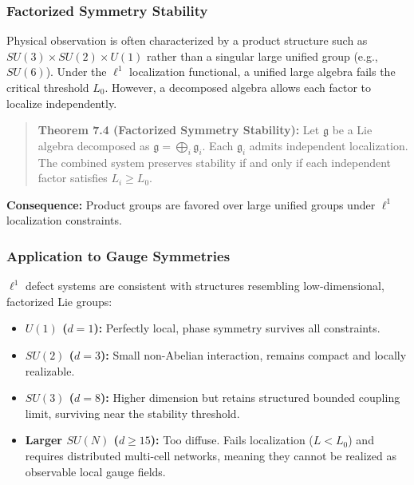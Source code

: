 \documentclass[
]{article}
\providecommand{\tightlist}{%
  \setlength{\itemsep}{0pt}\setlength{\parskip}{0pt}}
\begin{document}
\subsubsection{Factorized Symmetry
Stability}\label{factorized-symmetry-stability-1}

Physical observation is often characterized by a product structure such
as \(SU(3) \times SU(2) \times U(1)\) rather than a singular large
unified group (e.g., \(SU(6)\)). Under the \(\ell^1\) localization
functional, a unified large algebra fails the critical threshold
\(L_0\). However, a decomposed algebra allows each factor to localize
independently.

\begin{quote}
\textbf{Theorem 7.4 (Factorized Symmetry Stability):} Let
\(\mathfrak{g}\) be a Lie algebra decomposed as
\(\mathfrak{g} = \bigoplus_i \mathfrak{g}_i\). Each \(\mathfrak{g}_i\)
admits independent localization. The combined system preserves stability
if and only if each independent factor satisfies \(L_i \ge L_0\).
\end{quote}

\textbf{Consequence:} Product groups are favored over large unified
groups under \(\ell^1\) localization constraints.

\subsubsection{Application to Gauge
Symmetries}\label{application-to-gauge-symmetries-1}

\(\ell^1\) defect systems are consistent with structures resembling
low-dimensional, factorized Lie groups:

\begin{itemize}
\tightlist
\item
  \textbf{\(U(1)\) (\(d=1\)):} Perfectly local, phase symmetry survives
  all constraints.
\item
  \textbf{\(SU(2)\) (\(d=3\)):} Small non-Abelian interaction, remains
  compact and locally realizable.
\item
  \textbf{\(SU(3)\) (\(d=8\)):} Higher dimension but retains structured
  bounded coupling limit, surviving near the stability threshold.
\item
  \textbf{Larger \(SU(N)\) (\(d \ge 15\)):} Too diffuse. Fails
  localization (\(L < L_0\)) and requires distributed multi-cell
  networks, meaning they cannot be realized as observable local gauge
  fields.
\end{itemize}
\end{document}
